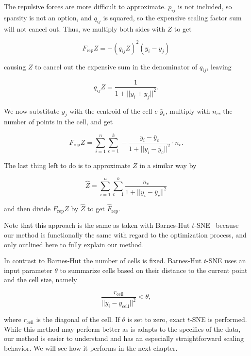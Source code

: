 The repulsive forces are more difficult to approximate. $p_{ij}$ is not
included, so sparsity is not an option, and $q_{ij}$ is squared, so the
expensive scaling factor sum will not cancel out. Thus, we multiply both sides
with $Z$ to get

\begin{equation}
  F_\text{rep}Z = -(q_{ij}Z)^2(y_i - y_j)
\end{equation}

causing $Z$ to cancel out the expensive sum in the denominator of $q_{ij}$, leaving

\begin{equation}
  q_{ij}Z = \frac{1}{1 + ||y_i + y_j||^2}.
\end{equation}

We now substitute $y_j$ with the centroid of the cell $c$ $\bar{y}_c$, multiply with
$n_c$, the number of points in the cell, and get

\begin{equation}
  F_\text{rep}Z = \sum_{i = 1}^{n} \sum_{c = 1}^{k} -\frac{y_i - \bar{y}_{c}}{1 + ||y_i - \bar{y}_{c}||^2} \cdot n_c.
  \label{eq:frepz}
\end{equation}

The last thing left to do is to approximate $Z$ in a similar way by

\begin{equation}
  \hat{Z} = \sum_{i = 1}^{n} \sum_{c = 1}^{k} \frac{n_c}{1 + ||y_i - \bar{y}_c||^2}
  \label{eq:zapprox}
\end{equation}

and then divide $F_\text{rep}Z$ by $\hat{Z}$ to get $\hat{F}_\text{rep}$.

Note that this approach is the same as taken with Barnes-Hut $t$-SNE~\cite{bhtsne} because
our method is functionally the same with regard to the optimization process, and
only outlined here to fully explain our method.

In contrast to Barnes-Hut the number of cells is fixed. Barnes-Hut $t$-SNE uses
an input parameter $\theta$ to summarize cells based on their distance to the
current point and the cell size, namely

\begin{equation}
  \frac{r_\text{cell}}{||y_i - y_\text{cell}||^2} < \theta,
\end{equation}

where $r_\text{cell}$ is the diagonal of the cell.
If $\theta$ is set to zero, exact $t$-SNE is performed. While this method may
perform better as is adapts to the specifics of the data, our method is easier
to understand and has an especially straightforward scaling behavior. We will see
how it performs in the next chapter.

